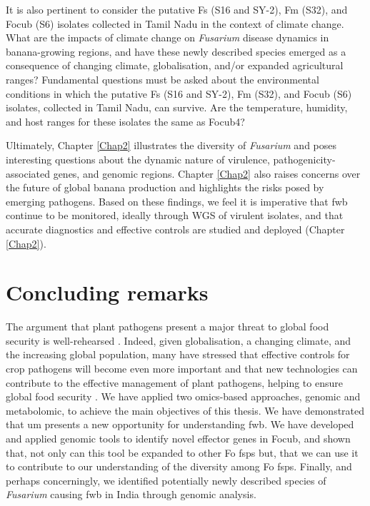It is also pertinent to consider the putative \ac{Fs} (S16 and SY-2), \ac{Fm} (S32), and \ac{Focub} (S6) isolates collected in Tamil Nadu in the context of climate change. What are the impacts of climate change on \textit{Fusarium} disease dynamics in banana-growing regions, and have these newly described species emerged as a consequence of changing climate, globalisation, and/or expanded agricultural ranges? Fundamental questions must be asked about the environmental conditions in which the putative \ac{Fs} (S16 and SY-2), \ac{Fm} (S32), and \ac{Focub} (S6) isolates, collected in Tamil Nadu, can survive. Are the temperature, humidity, and host ranges for these isolates the same as \ac{Focub4}? 

Ultimately, Chapter \ref{Chap2} illustrates the diversity of \textit{Fusarium} and poses interesting questions about the dynamic nature of virulence, pathogenicity-associated genes, and genomic regions. Chapter \ref{Chap2} also raises concerns over the future of global banana production and highlights the risks posed by emerging pathogens. Based on these findings, we feel it is imperative that \ac{fwb} continue to be monitored, ideally through WGS of virulent isolates, and that accurate diagnostics and effective controls are studied and deployed (Chapter \ref{Chap2}).

\section{Concluding remarks} 

The argument that plant pathogens present a major threat to global food security is well-rehearsed \parencite{Bebber2014, Fones2020, Nelson2020, Ristaino2021}. Indeed, given globalisation, a changing climate, and the increasing global population, many have stressed that effective controls for crop pathogens will become even more important and that new technologies can contribute to the effective management of plant pathogens, helping to ensure global food security \parencite{Jeger2021, Rizzo2021, Bebber2023, Singh2023}. We have applied two omics-based approaches, genomic and metabolomic, to achieve the main objectives of this thesis. We have demonstrated that \acl{um} presents a new opportunity for understanding \ac{fwb}. We have developed and applied genomic tools to identify novel effector genes in \ac{Focub}, and shown that, not only can this tool be expanded to other \ac{Fo} \acp{fsp} but, that we can use it to contribute to our understanding of the diversity among \ac{Fo} \acp{fsp}. Finally, and perhaps concerningly, we identified potentially newly described species of \textit{Fusarium} causing \ac{fwb} in India through genomic analysis. 

